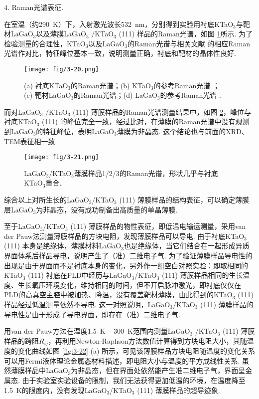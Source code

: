\documentclass[12pt,a4paper,openany,twoside,UTF-8]{book}
\begin{document}
4. Raman光谱表征. 

在室温（约\SI{290}{K}）下，入射激光波长\SI{532}{nm}，分别得到实验用衬底KTaO$_3$与靶材LaGaO$_3$以及薄膜LaGaO$_3$ /KTaO$_3$ (111) 样品的Raman光谱，如图 \ref{fig:3-20}所示. 为了检验测量的合理性，KTaO$_3$以及LaGaO$_3$的Raman光谱与相关文献 \cite{ref40, ref41}的相应Raman光谱作对比，特征峰位基本一致，说明测量正确，衬底和靶材的晶体性良好. 

\begin{figure}[htbp]
\centering
\texttt{[image: fig/3-20.png]}
\caption{(a) 衬底KTaO$_3$的Raman光谱；(b) KTaO$_3$的参考Raman光谱 \cite{ref40}；\\
(c) 靶材LaGaO$_3$的Raman光谱；(d) LaGaO$_3$的参考Raman光谱 \cite{ref41}.}
\label{fig:3-20} 
\end{figure}

而对LaGaO$_3$ /KTaO$_3$ (111) 薄膜样品的Raman光谱测量结果中，如图 \ref{fig:3-21}，峰位与衬底KTaO$_3$ (111) 的峰位完全一致，经过比对，在薄膜的Raman光谱中没有观测到LaGaO$_3$的特征峰位，表明LaGaO$_3$薄膜为非晶态. 这个结论也与前面的XRD、TEM表征相一致.

\begin{figure}[htbp]
\centering
\texttt{[image: fig/3-21.png]}
\caption{LaGaO$_3$/KTaO$_3$薄膜样品1/2/3的Raman光谱，形状几乎与衬底KTaO$_3$重合.}
\label{fig:3-21} 
\end{figure}

综合以上对所生长的LaGaO$_3$/KTaO$_3$ (111) 薄膜样品的结构表征，可以确定薄膜层LaGaO$_3$为非晶态，没有成功制备出高质量的单晶薄膜. 

至于LaGaO$_3$/KTaO$_3$ (111) 薄膜样品的物性表征，即低温电输运测量，采用van der Pauw法测量薄膜样品的方块电阻，发现薄膜样品可以导电. 由于衬底KTaO$_3$ (111) 本身是绝缘体，薄膜材料LaGaO$_3$也是绝缘体，当它们结合在一起形成异质界面体系后样品导电，说明产生了（准）二维电子气. 为了验证薄膜样品导电性的出现是由于界面而不是衬底本身的变化，另外作一组空白对照实验：即取相同的KTaO$_3$ (111) 衬底在PLD中经历与LaGaO$_3$/KTaO$_3$ (111) 薄膜样品相同的生长温度、生长氧压环境变化，维持相同的时间，但不开启脉冲激光，即衬底仅仅在PLD的高真空主腔中被加热、降温，没有覆盖靶材薄膜，由此得到的KTaO$_3$ (111) 样品经过低温测量依然不导电. 这一对照说明，LaGaO$_3$/KTaO$_3$ (111) 薄膜样品的导电性是由于形成了导电界面，即存在（准）二维电子气.

用van der Pauw方法在温度\SI{1.5}{K} – \SI{300}{K}范围内测量LaGaO$_3$ /KTaO$_3$ (111) 薄膜样品的跨阻$R_{ij}$，再利用Newton-Raphson方法数值计算得到方块电阻大小，其随温度的变化曲线如图 \ref{fig:3-22} (a) 所示，可见该薄膜样品方块电阻随温度的变化关系可以用Fermi液体理论金属态材料描述，即电阻大小与温度的平方成线性关系. 虽然薄膜样品中LaGaO$_3$为非晶态，但在界面处依然能产生准二维电子气，界面呈金属态. 由于实验室实验设备的限制，我们无法获得更加低温的环境，在温度降至\SI{1.5}{K}的限度内，没有发现LaGaO$_3$/KTaO$_3$ (111) 薄膜样品的超导迹象.
\end{document}
